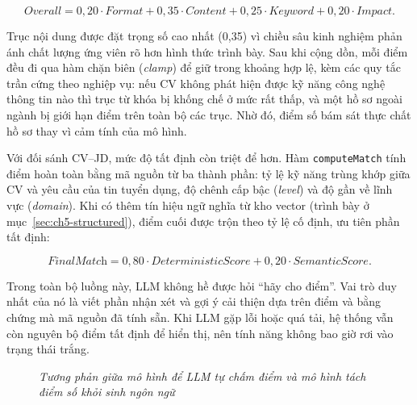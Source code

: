 \documentclass[../DoAn.tex]{subfiles}
\begin{document}
\[
\textit{Overall} = 0{,}20\cdot \textit{Format} + 0{,}35\cdot \textit{Content} + 0{,}25\cdot \textit{Keyword} + 0{,}20\cdot \textit{Impact}.
\]

Trục nội dung được đặt trọng số cao nhất (0,35) vì chiều sâu kinh nghiệm phản ánh chất lượng ứng viên rõ hơn hình thức trình bày. Sau khi cộng dồn, mỗi điểm đều đi qua hàm chặn biên (\textit{clamp}) để giữ trong khoảng hợp lệ, kèm các quy tắc trần cứng theo nghiệp vụ: nếu CV không phát hiện được kỹ năng công nghệ thông tin nào thì trục từ khóa bị khống chế ở mức rất thấp, và một hồ sơ ngoài ngành bị giới hạn điểm trên toàn bộ các trục. Nhờ đó, điểm số bám sát thực chất hồ sơ thay vì cảm tính của mô hình.

Với đối sánh CV--JD, mức độ tất định còn triệt để hơn. Hàm \texttt{computeMatch} tính điểm hoàn toàn bằng mã nguồn từ ba thành phần: tỷ lệ kỹ năng trùng khớp giữa CV và yêu cầu của tin tuyển dụng, độ chênh cấp bậc (\textit{level}) và độ gần về lĩnh vực (\textit{domain}). Khi có thêm tín hiệu ngữ nghĩa từ kho vector (trình bày ở mục~\ref{sec:ch5-structured}), điểm cuối được trộn theo tỷ lệ cố định, ưu tiên phần tất định:

\[
\textit{FinalMatch} = 0{,}80\cdot \textit{DeterministicScore} + 0{,}20\cdot \textit{SemanticScore}.
\]

Trong toàn bộ luồng này, LLM không hề được hỏi ``hãy cho điểm''. Vai trò duy nhất của nó là viết phần nhận xét và gợi ý cải thiện dựa trên điểm và bằng chứng mà mã nguồn đã tính sẵn. Khi LLM gặp lỗi hoặc quá tải, hệ thống vẫn còn nguyên bộ điểm tất định để hiển thị, nên tính năng không bao giờ rơi vào trạng thái trắng.

\begin{figure}[ht]
  \centering
  \caption{\textit{Tương phản giữa mô hình để LLM tự chấm điểm và mô hình tách điểm số khỏi sinh ngôn ngữ}}
  \label{fig:ch5-scoring-model}
\end{figure}
\end{document}

